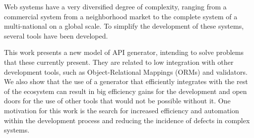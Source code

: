 Web systems have a very diversified degree of complexity, ranging from a commercial
system from a neighborhood market to the complete system of a multi-national on a
global scale. To simplify the development of these systems, several tools have been
developed.

This work presents a new model of API generator, intending to solve problems that
these currently present. They are related to low integration with other development
tools, such as Object-Relational Mappings (ORMs) and validators. We also show that
the use of a generator that efficiently integrates with the rest of the ecosystem
can result in big efficiency gains for the development and open doors for the use
of other tools that would not be possible without it. One motivation for this
work is the search for increased efficiency and automation within the development
process and reducing the incidence of defects in complex systems.
